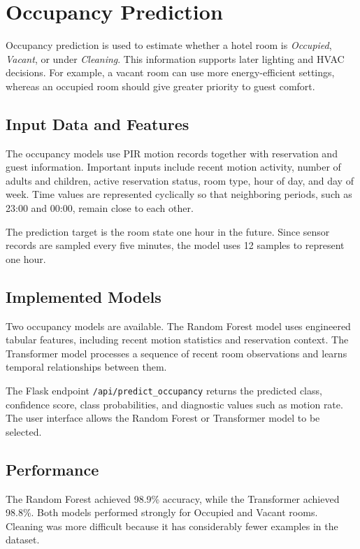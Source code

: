 \chapter{Occupancy Prediction}
\label{chap:occupancy-prediction}

Occupancy prediction is used to estimate whether a hotel room is
\textit{Occupied}, \textit{Vacant}, or under \textit{Cleaning}. This
information supports later lighting and HVAC decisions. For example, a vacant
room can use more energy-efficient settings, whereas an occupied room should
give greater priority to guest comfort.

\section{Input Data and Features}

The occupancy models use PIR motion records together with reservation and guest
information. Important inputs include recent motion activity, number of adults
and children, active reservation status, room type, hour of day, and day of
week. Time values are represented cyclically so that neighboring periods, such
as 23:00 and 00:00, remain close to each other.

The prediction target is the room state one hour in the future. Since sensor
records are sampled every five minutes, the model uses 12 samples to represent
one hour.

\section{Implemented Models}

Two occupancy models are available. The Random Forest model uses engineered
tabular features, including recent motion statistics and reservation context.
The Transformer model processes a sequence of recent room observations and
learns temporal relationships between them.

The Flask endpoint \texttt{/api/predict\_occupancy} returns the predicted
class, confidence score, class probabilities, and diagnostic values such as
motion rate. The user interface allows the Random Forest or Transformer model
to be selected.

\section{Performance}

The Random Forest achieved 98.9\% accuracy, while the Transformer achieved
98.8\%. Both models performed strongly for Occupied and Vacant rooms.
Cleaning was more difficult because it has considerably fewer examples in the
dataset.


